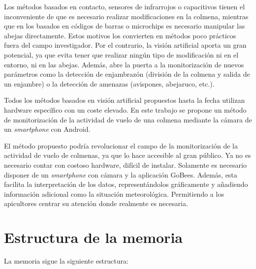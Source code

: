 Los métodos basados en contacto, sensores de infrarrojos o capacitivos
tienen el inconveniente de que es necesario realizar modificaciones en
la colmena, mientras que en los basados en códigos de barras o
microchips es necesario manipular las abejas directamente. Estos motivos
los convierten en métodos poco prácticos fuera del campo investigador.
Por el contrario, la visión artificial aporta un gran potencial, ya que
evita tener que realizar ningún tipo de modificación ni en el entorno,
ni en las abejas. Además, abre la puerta a la monitorización de nuevos
parámetros como la detección de enjambrazón (división de la colmena y
salida de un enjambre) o la detección de amenazas (avispones, abejaruco,
etc.).

Todos los métodos basados en visión artificial propuestos hasta la fecha
utilizan hardware específico con un coste elevado. En este trabajo se
propone un método de monitorización de la actividad de vuelo de una
colmena mediante la cámara de un \emph{smartphone} con Android.

El método propuesto podría revolucionar el campo de la monitorización de
la actividad de vuelo de colmenas, ya que lo hace accesible al gran
público. Ya no es necesario contar con costoso hardware, difícil de
instalar. Solamente es necesario disponer de un \emph{smartphone} con cámara y
la aplicación GoBees. Además, esta facilita la interpretación de los
datos, representándolos gráficamente y añadiendo información adicional
como la situación meteorológica. Permitiendo a los apicultores centrar
su atención donde realmente es necesaria.

\section{Estructura de la memoria}\label{estructura-de-la-memoria}

La memoria sigue la siguiente estructura:

